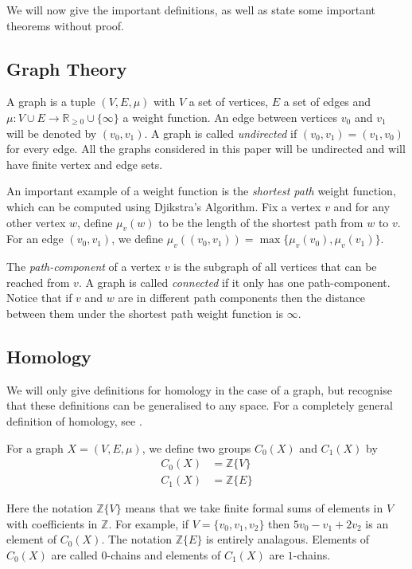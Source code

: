 \documentclass[12pt,a4paper]{amsart}
\numberwithin{equation}{section}
\def\Z{{\mathbb Z}}
\theoremstyle{plain}
\theoremstyle{definition}
\begin{document}
We will now give the important definitions, as well as state some important theorems without proof.

\subsection{Graph Theory}

A graph is a tuple $(V, E, \mu)$ with $V$ a set of vertices, $E$ a set of edges and $\mu : V \cup E \to \mathbb{R}_{\geq 0} \cup \{\infty\}$ a weight function. An edge between vertices $v_0$ and $v_1$ will be denoted by $(v_0, v_1)$. A graph is called \textit{undirected} if $(v_0, v_1) = (v_1, v_0)$ for every edge. All the graphs considered in this paper will be undirected and will have finite vertex and edge sets.

An important example of a weight function is the \textit{shortest path} weight function, which can be computed using Djikstra's Algorithm. Fix a vertex $v$ and for any other vertex $w$, define $\mu_v(w)$ to be the length of the shortest path from $w$ to $v$. For an edge $(v_0, v_1)$, we define $\mu_v((v_0, v_1)) = \max\{\mu_v(v_0), \mu_v(v_1)\}$.

The \textit{path-component} of a vertex $v$ is the subgraph of all vertices that can be reached from $v$. A graph is called \textit{connected} if it only has one path-component. Notice that if $v$ and $w$ are in different path components then the distance between them under the shortest path weight function is $\infty$.

\subsection{Homology}

We will only give definitions for homology in the case of a graph, but recognise that these definitions can be generalised to any space. For a completely general definition of homology, see \cite{hatcher}.

For a graph $X = (V, E, \mu)$, we define two groups $C_0(X)$ and $C_1(X)$ by
\begin{align*}
C_0(X) &= \Z\{V\}  \\
C_1(X) &= \Z\{E\}
\end{align*}

Here the notation $\Z\{V\}$ means that we take finite formal sums of elements in $V$ with coefficients in $\Z$. For example, if $V=\{v_0, v_1, v_2\}$ then $5v_0 - v_1 + 2v_2$ is an element of $C_0(X)$. The notation $\Z\{E\}$ is entirely analagous. Elements of $C_0(X)$ are called $0$-chains and elements of $C_1(X)$ are $1$-chains.
\end{document}
